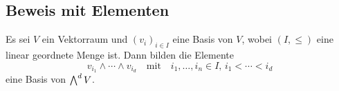 \subsection{Beweis mit Elementen}

\begin{proposition}
  Es sei $V$ ein Vektorraum und $(v_i)_{i \in I}$ eine Basis von $V$, wobei $(I, \leq)$ eine linear geordnete Menge ist.
  Dann bilden die Elemente
  \[
    v_{i_1} \wedge \dotsb \wedge v_{i_d}
    \quad\text{mit}\quad
    i_1, \dotsc, i_n \in I,
    \,
    i_1 < \dotsb < i_d
  \]
  eine Basis von $\bigwedge^{d} V$.
\end{proposition}
